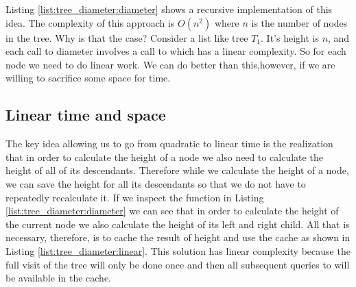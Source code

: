 Listing \ref{list:tree_diameter:diameter} shows a recursive implementation of this idea. The complexity of this approach is $O(n^2)$ where $n$ is the number of nodes in the tree. Why is that the case? Consider a list like tree $T_1$. It's height is $n$, and each call to diameter involves a call to  which has a linear complexity. So for each node we need to do linear work. We can do better than this,however,  if we are willing to sacrifice some space for time. 



\subsection{Linear time and space}
\label{tree_diameter:sec:linear}
The key idea allowing us to go from quadratic to linear time is the realization  that in order to calculate the height of a node we also need to calculate the height of all of its descendants. Therefore while we calculate the height of a node, we can save the height for all its descendants so that we do not have to repeatedly recalculate it. If we inspect the function  in Listing \ref{list:tree_diameter:diameter} we can see that in order to calculate the height of the current node we also calculate the height of its left and right child. 
All that is necessary, therefore,  is to cache the result of height and use the cache as shown in Listing \ref{list:tree_diameter:linear}. This solution has linear complexity because the full visit of the tree will only be done once and then all subsequent queries to  will be available in the cache. 


